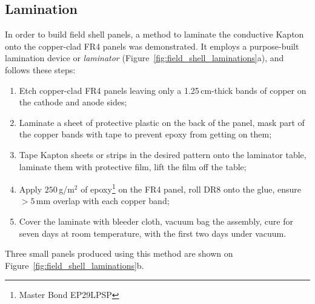\documentclass[a4paper,12pt]{article}
\newcommand{\DR}{DR8}
\begin{document}
\subsection{Lamination}
\label{sec:lamination}
In order to build field shell panels, a method to laminate the conductive Kapton onto the copper-clad FR4 panels was demonstrated. It employs a purpose-built lamination device or \textit{laminator} (Figure~\ref{fig:field_shell_laminations}a), and follows these steps:
\begin{enumerate}
\item Etch copper-clad FR4 panels leaving only a 1.25\,cm-thick bands of copper on the cathode and anode sides;
\item Laminate a sheet of protective plastic on the back of the panel, mask part of the copper bands with tape to prevent epoxy from getting on them;
\item Tape Kapton sheets or strips in the desired pattern onto the laminator table, laminate them with protective film, lift the film off the table;
\item Apply $250$\,g/m$^2$ of epoxy\footnote{Master Bond EP29LPSP} on the FR4 panel, roll {\DR} onto the glue, ensure $>5\,$mm overlap with each copper band;
\item Cover the laminate with bleeder cloth, vacuum bag the assembly, cure for seven days at room temperature, with the first two days under vacuum.
\end{enumerate}
Three small panels produced using this method are shown on Figure~\ref{fig:field_shell_laminations}b.
\end{document}
